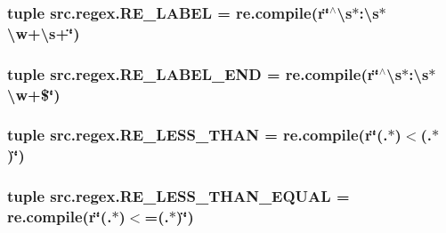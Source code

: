 \hypertarget{namespacesrc_1_1regex_ab87052932bdf55f558ae3d8bfeb8d55e}{
\subsubsection[{R\-E\-\_\-\-L\-A\-B\-E\-L}]{\setlength{\rightskip}{0pt plus 5cm}tuple src.\-regex.\-R\-E\-\_\-\-L\-A\-B\-E\-L = re.\-compile(r\char`\"{}$^\wedge$\textbackslash{}s$\ast$\-:\textbackslash{}s$\ast$\textbackslash{}w+\textbackslash{}s+\char`\"{})}}\label{namespacesrc_1_1regex_ab87052932bdf55f558ae3d8bfeb8d55e}
\hypertarget{namespacesrc_1_1regex_ae23a5feb43bb616771baf96b22b6edf9}{
\subsubsection[{R\-E\-\_\-\-L\-A\-B\-E\-L\-\_\-\-E\-N\-D}]{\setlength{\rightskip}{0pt plus 5cm}tuple src.\-regex.\-R\-E\-\_\-\-L\-A\-B\-E\-L\-\_\-\-E\-N\-D = re.\-compile(r\char`\"{}$^\wedge$\textbackslash{}s$\ast$\-:\textbackslash{}s$\ast$\textbackslash{}w+\$\char`\"{})}}\label{namespacesrc_1_1regex_ae23a5feb43bb616771baf96b22b6edf9}
\hypertarget{namespacesrc_1_1regex_a033b323a439ec413a434843234f0cc21}{
\subsubsection[{R\-E\-\_\-\-L\-E\-S\-S\-\_\-\-T\-H\-A\-N}]{\setlength{\rightskip}{0pt plus 5cm}tuple src.\-regex.\-R\-E\-\_\-\-L\-E\-S\-S\-\_\-\-T\-H\-A\-N = re.\-compile(r\char`\"{}(.$\ast$)$<$(.$\ast$)\char`\"{})}}\label{namespacesrc_1_1regex_a033b323a439ec413a434843234f0cc21}
\hypertarget{namespacesrc_1_1regex_a6e714a90fa251f77c5b838f3bef87f3a}{
\subsubsection[{R\-E\-\_\-\-L\-E\-S\-S\-\_\-\-T\-H\-A\-N\-\_\-\-E\-Q\-U\-A\-L}]{\setlength{\rightskip}{0pt plus 5cm}tuple src.\-regex.\-R\-E\-\_\-\-L\-E\-S\-S\-\_\-\-T\-H\-A\-N\-\_\-\-E\-Q\-U\-A\-L = re.\-compile(r\char`\"{}(.$\ast$)$<$=(.$\ast$)\char`\"{})}}\label{namespacesrc_1_1regex_a6e714a90fa251f77c5b838f3bef87f3a}
